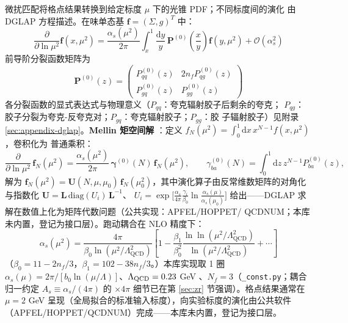 \documentclass[11pt,a4paper]{ctexart}
\newcommand{\order}[1]{\mathcal{O}(#1)}
\newcommand{\code}[1]{\texttt{#1}}
\begin{document}
微扰匹配将格点结果转换到给定标度 $\mu$ 下的光锥 PDF；不同标度间的演化
由 DGLAP 方程描述。在味单态基 $\mathbf{f}=(\Sigma,g)^T$ 中：
\begin{equation}
\frac{\partial}{\partial \ln \mu^2} \mathbf{f}(x, \mu^2) =
\frac{\alpha_s(\mu^2)}{2\pi} \int_x^1 \frac{\mathrm{d}y}{y} \,
\mathbf{P}^{(0)}\!\left(\frac{x}{y}\right) \mathbf{f}(y, \mu^2)
+ \order{\alpha_s^2}
\end{equation}
前导阶分裂函数矩阵为
\begin{equation}
\mathbf{P}^{(0)}(z) = \begin{pmatrix}
P_{qq}^{(0)}(z) & 2n_f P_{qg}^{(0)}(z) \\[4pt]
P_{gq}^{(0)}(z) & P_{gg}^{(0)}(z)
\end{pmatrix}
\end{equation}
各分裂函数的显式表达式与物理意义（$P_{qq}$：夸克辐射胶子后剩余的夸克；
$P_{qg}$：胶子分裂为夸克-反夸克对；$P_{gq}$：夸克辐射胶子；$P_{gg}$：胶
子辐射胶子）见附录 \ref{sec:appendix-dglap}。\textbf{Mellin 矩空间解}
：定义 $f_N(\mu^2)=\int_0^1\mathrm{d}x\,x^{N-1}f(x,\mu^2)$，卷积化为
普通乘积：
\begin{equation}
\frac{\partial}{\partial \ln \mu^2}\,\mathbf f_N(\mu^2)
= \frac{\alpha_s(\mu^2)}{2\pi}\,\boldsymbol\gamma^{(0)}(N)\,
\mathbf f_N(\mu^2),
\qquad \gamma^{(0)}_{ba}(N) = \int_0^1\mathrm{d}z\,z^{N-1}
P_{ba}^{(0)}(z),
\end{equation}
解为 $\mathbf f_N(\mu^2) = \mathbf U(N,\mu,\mu_0)\,
\mathbf f_N(\mu_0^2)$，其中演化算子由反常维数矩阵的对角化与指数化
$\mathbf U = \mathbf L\,\mathrm{diag}(U_i)\,\mathbf L^{-1}$、
$U_i = \exp\bigl[\frac{\alpha_s}{4\pi}
\frac{\gamma_i}{\beta_0}\ln\frac{\alpha_s(\mu)}{\alpha_s(\mu_0)}\bigr]$
给出——DGLAP 求解在数值上化为矩阵代数问题（公共实现：APFEL/HOPPET/
QCDNUM；本库未内置，登记为接口层）。跑动耦合在 NLO 精度下：
\begin{equation}
\alpha_s(\mu^2) = \frac{4\pi}{\beta_0 \ln(\mu^2/\Lambda_{\text{QCD}}^2)}
\left[ 1 - \frac{\beta_1}{\beta_0^2}
\frac{\ln\ln(\mu^2/\Lambda_{\text{QCD}}^2)}
{\ln(\mu^2/\Lambda_{\text{QCD}}^2)} + \cdots \right]
\end{equation}
（$\beta_0=11-2n_f/3$，$\beta_1=102-38n_f/3$。）本库实现取 1 圈
$\alpha_s(\mu)=2\pi/[b_0\ln(\mu/\Lambda)]$、$\Lambda_{\rm QCD}=0.23$ GeV
、$N_f=3$（\code{\_const.py}；耦合归一约定 $A_s\equiv\alpha_s/(4\pi)$
的 $\times4\pi$ 细节已在第 \ref{sec:zr} 节强调）。格点结果通常在
$\mu=2$ GeV 呈现（全局拟合的标准输入标度），向实验标度的演化由公共软件
（APFEL/HOPPET/QCDNUM）完成——本库未内置，登记为接口层。
\end{document}
